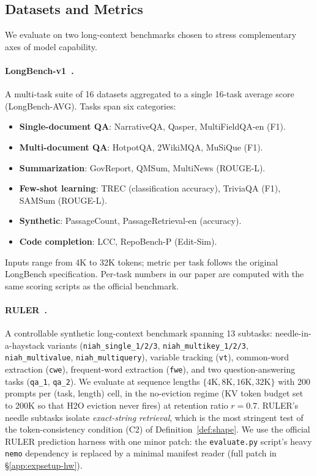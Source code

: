 \documentclass{article}
\begin{document}
\subsection{Datasets and Metrics}
\label{app:expsetup-data}
 
We evaluate on two long-context benchmarks chosen to stress complementary axes of model capability.
 
\paragraph{LongBench-v1~\citep{longbench}.} A multi-task suite of 16 datasets aggregated to a single 16-task average score (LongBench-AVG). Tasks span six categories:
\begin{itemize}\itemsep0pt
    \item \textbf{Single-document QA}: NarrativeQA, Qasper, MultiFieldQA-en (F1).
    \item \textbf{Multi-document QA}: HotpotQA, 2WikiMQA, MuSiQue (F1).
    \item \textbf{Summarization}: GovReport, QMSum, MultiNews (ROUGE-L).
    \item \textbf{Few-shot learning}: TREC (classification accuracy), TriviaQA (F1), SAMSum (ROUGE-L).
    \item \textbf{Synthetic}: PassageCount, PassageRetrieval-en (accuracy).
    \item \textbf{Code completion}: LCC, RepoBench-P (Edit-Sim).
\end{itemize}
Inputs range from 4K to 32K tokens; metric per task follows the original LongBench specification. Per-task numbers in our paper are computed with the same scoring scripts as the official benchmark.
 
\paragraph{RULER~\citep{ruler}.} A controllable synthetic long-context benchmark spanning 13 subtasks: needle-in-a-haystack variants (\texttt{niah\_single\_1/2/3}, \texttt{niah\_multikey\_1/2/3}, \texttt{niah\_multivalue}, \texttt{niah\_multiquery}), variable tracking (\texttt{vt}), common-word extraction (\texttt{cwe}), frequent-word extraction (\texttt{fwe}), and two question-answering tasks (\texttt{qa\_1}, \texttt{qa\_2}). We evaluate at sequence lengths $\{4\text{K}, 8\text{K}, 16\text{K}, 32\text{K}\}$ with 200 prompts per (task, length) cell, in the no-eviction regime (KV token budget set to 200K so that H2O eviction never fires) at retention ratio $r{=}0.7$. RULER's needle subtasks isolate \emph{exact-string retrieval}, which is the most stringent test of the token-consistency condition (C2) of Definition~\ref{def:shape}. We use the official RULER prediction harness with one minor patch: the \texttt{evaluate.py} script's heavy \texttt{nemo} dependency is replaced by a minimal manifest reader (full patch in \S\ref{app:expsetup-hw}).
 
\end{document}
